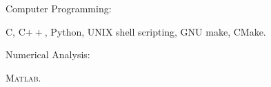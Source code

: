 \documentclass[10pt]{article}
\renewcommand{\section}[1]{\pagebreak[3]%
    \vspace{1.3\baselineskip}%
    \phantomsection\addcontentsline{toc}{section}{#1}%
    \noindent\llap{\scshape\smash{\parbox[t]{\marginparwidth}{\hyphenpenalty=10000\raggedright #1}}}%
    \vspace{-\baselineskip}\par}
\newcommand{\halfblankline}{\quad\vspace{-0.5\baselineskip}\pagebreak[3]}
\providecommand\Matlab{\textsc{Matlab}}
\begin{document}
Computer Programming:
%
\begin{innerlist}
    \item C, C$++$, Python, UNIX shell scripting, GNU make, CMake.
\end{innerlist}

\halfblankline

Numerical Analysis:
%
\begin{innerlist}
    \item \Matlab.
\end{innerlist}


%






\end{document}
